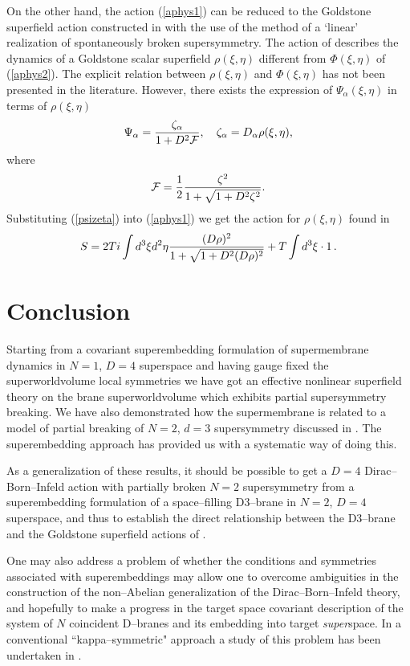 \documentclass[a4paper,12pt]{article}
\begin{document}
On the other hand, the action (\ref{aphys1}) can be reduced to
the Goldstone superfield action constructed in \cite{ik1} with the
use of the method of a `linear' realization of spontaneously
broken supersymmetry. The action of \cite{ik1} describes the
dynamics of a Goldstone scalar superfield $\rho(\xi,\eta)$
different from
$\Phi(\xi,\eta)$ of (\ref{aphys2}). The explicit relation between
$\rho(\xi,\eta)$ and $\Phi(\xi,\eta)$ has not been presented in the
literature. However, there exists \cite{ik1} the expression of
$\Psi_\alpha(\xi,\eta)$ in terms of $\rho(\xi,\eta)$
\begin{equation}\label{psizeta}
\Psi_\alpha={\zeta_\alpha\over{ 1+D^2{\cal F}}}, \quad
\zeta_\alpha=D_\alpha \rho(\xi,\eta),
\end{equation}
where
\begin{equation}\label{tilphi}
{\cal F}={1\over 2} {\zeta^2\over{1+\sqrt{1+D^2\zeta^2}}}.
\end{equation}
Substituting (\ref{psizeta}) into (\ref{aphys1}) we get the
action for $\rho(\xi,\eta)$ found in \cite{ik1}
$$
S=2Ti\int d^3\xi d^2\eta
{(D\rho)^2\over{1+\sqrt{1+D^2(D\rho)^2}}}+T\int d^3\xi \cdot 1\,.
$$

\section{Conclusion}
Starting from a covariant superembedding formulation of
supermembrane dynamics in $N=1$, $D=4$ superspace and having
gauge fixed the superworldvolume local symmetries we have got an
effective nonlinear superfield theory on the brane
superworldvolume which exhibits partial supersymmetry breaking.
We have also demonstrated how the supermembrane is related to a
model of partial breaking of $N=2$, $d=3$ supersymmetry discussed
in \cite{ik1}. The superembedding approach has provided us with a
systematic way of doing this.

As a generalization of these results, it should be possible to get
a $D=4$ Dirac--Born--Infeld action with partially broken $N=2$
supersymmetry from a superembedding formulation of a
space--filling D3--brane in $N=2$, $D=4$ superspace, and thus to
establish the direct relationship between the D3--brane and the
Goldstone superfield actions of \cite{bg2,rt,fer}.

One may also address a problem of whether the conditions and
symmetries associated with superembeddings may allow one to
overcome ambiguities in the construction of the non--Abelian
generalization of the Dirac--Born--Infeld theory, and hopefully
to make a progress in the target space covariant description of
the system of $N$ coincident D--branes and its embedding into
target {\it super}space. In a conventional ``kappa--symmetric"
approach a study of this problem has been undertaken in \cite{em}.
\end{document}

